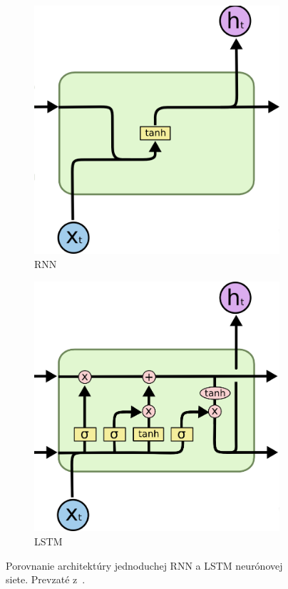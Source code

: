 \begin{figure}[ht!]
    \centering
    \begin{subfigure}{.49\textwidth}
        \centering
        \includegraphics[width=0.7\linewidth]{figures/SimpleRNN-unit.png}   
        \caption{RNN}
        \label{fig:SimpleRNN-unit}
    \end{subfigure}
    \begin{subfigure}{.49\textwidth}
        \centering
        \includegraphics[width=0.7\linewidth]{figures/LSTM-unit.png}   
        \caption{LSTM}
        \label{fig:LSTM-unit}
    \end{subfigure}
    \caption{Porovnanie architektúry jednoduchej RNN a LSTM neurónovej siete. Prevzaté z~\cite{Olah2015}.} \label{fig:RNN-vs-LSTM}
\end{figure}

